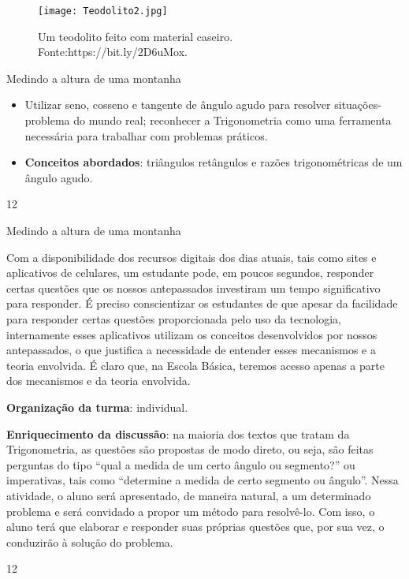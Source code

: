 \begin{figure}[H]
\centering
\texttt{[image: Teodolito2.jpg]}
\caption{Um teodolito feito com material caseiro. Fonte:https://bit.ly/2D6uMox.}
\label{Teodolito2}
\end{figure}
\clearpage
\def\currentcolor{session2}
\begin{objectives}{Medindo a altura de uma montanha}
{
\begin{itemize}
\item Utilizar seno, cosseno e tangente de ângulo agudo para resolver situações-problema do mundo real; reconhecer a Trigonometria como uma ferramenta necessária para trabalhar com problemas práticos.

\item \textbf{Conceitos abordados}: triângulos retângulos e razões trigonométricas de um ângulo agudo.
\end{itemize}
}{1}{2}
\end{objectives}
\mspace{-2.25em}
\begin{sugestions}{Medindo a altura de uma montanha}
{
Com a disponibilidade dos recursos digitais dos dias atuais, tais como sites e aplicativos de celulares, um estudante pode, em poucos segundos, responder certas questões que os nossos antepassados investiram um tempo significativo para responder. É preciso conscientizar os estudantes de que apesar da facilidade para responder certas questões proporcionada pelo uso da tecnologia, internamente esses aplicativos utilizam os conceitos desenvolvidos por nossos antepassados, o que justifica a necessidade de entender esses mecanismos e a teoria envolvida. É claro que, na Escola Básica, teremos acesso apenas a parte dos mecanismos e da teoria envolvida.

\textbf{Organização da turma}: individual.

\textbf{Enriquecimento da discussão}: na maioria dos textos que tratam da Trigonometria, as questões são propostas de modo direto, ou seja, são feitas perguntas do tipo ``qual a medida de um certo ângulo ou segmento?'' ou imperativas, tais como ``determine a medida de certo segmento ou ângulo''. Nessa atividade, o aluno será apresentado, de maneira natural, a um determinado problema e será convidado a propor um método para resolvê-lo. Com isso, o aluno terá que elaborar e responder suas próprias questões que, por sua vez, o conduzirão à solução do problema.
}{1}{2}
\end{sugestions}
\mspace{-1em}
